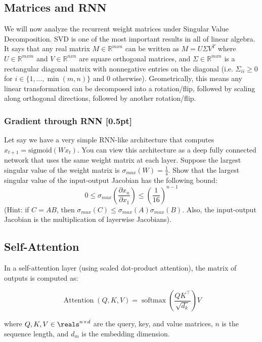 \subsection{Matrices and RNN}
We will now analyze the recurrent weight matrices under Singular Value Decomposition. 
SVD is one of the most important results in all of linear algebra. It says that any real matrix $M \in \mathbb{R}^{mxn}$ can be written as $M = U \Sigma V^{T}$ where $U \in \mathbb{R}^{mxm}$ and $V \in \mathbb{R}^{nxn}$ are square orthogonal matrices, and $\Sigma \in \mathbb{R}^{mxn}$ is a rectangular diagonal matrix with nonnegative entries on the diagonal (i.e. $\Sigma_{ii} \geq 0$ for $i \in \{1, \dots, \min(m, n)\}$ and $0$ otherwise). Geometrically, this means any linear transformation can be decomposed into a rotation/flip, followed by scaling along orthogonal directions, followed by another rotation/flip.

\subsubsection{Gradient through RNN {\color{blue} [0.5pt]} \LI}
Let say we have a very simple RNN-like architecture that computes $x_{t+1} = \text{sigmoid}(Wx_t)$. You can view this architecture as a deep fully connected network that uses the same weight matrix at each layer. Suppose the largest singular value of the weight matrix is $\sigma_{max}(W) = \frac{1}{4}$. Show that the largest singular value of the input-output Jacobian has the following bound: {\color{red}$$0 \leq \sigma_{max}(\frac{\partial x_n}{\partial x_1}) \leq (\frac{1}{16})^{n-1}$$} \newline (Hint: if $C=AB$, then $\sigma_{max}(C) \leq \sigma_{max}(A) \sigma_{max}(B)$. Also, the input-output Jacobian is the multiplication of layerwise Jacobians). 

\subsection{Self-Attention}

In a self-attention layer (using scaled dot-product attention), the matrix of outputs is computed as:

$$\operatorname{Attention}(Q, K, V) = \operatorname{softmax}\left(\frac{QK^\top}{\sqrt{d_k}}\right)V$$

where $Q, K, V \in \reals^{n \times d}$ are the query, key, and value matrices, $n$ is the sequence length, and $d_m$ is the embedding dimension.

